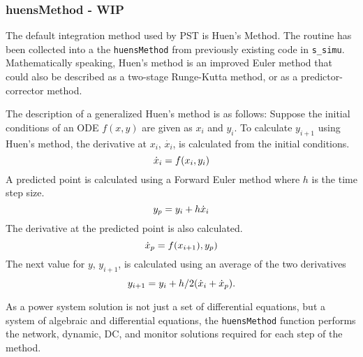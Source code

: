 
\subsubsection{huensMethod - WIP}  
The default integration method used by PST is Huen's Method.
The routine has been collected into a the \verb|huensMethod| from previously existing code in \verb|s_simu|.
Mathematically speaking, Huen's method is an improved Euler method that could also be described as a two-stage Runge-Kutta method, or as a predictor-corrector method.

The description of a generalized Huen's method is as follows:
Suppose the initial conditions of an ODE $f(x,y)$ are given as $x_i$ and $y_i$.
To calculate $y_{i+1}$ using Huen's method, the derivative at $x_i$, $\dot{x_i}$, is calculated from the initial conditions.
\begin{equation}{\label{eq: huens1} }
\dot{x}_i = f(x_i, y_i)
\end{equation} 
\noindent A predicted point is calculated using a Forward Euler method where $h$ is the time step size.
\begin{equation}{\label{eq: huens2} }
y_p = y_i + h \dot{x}_i
\end{equation} 
\noindent The derivative at the predicted point is also calculated.
\begin{equation}{\label{eq: huens3} }
\dot{x}_p = f(x_{i+1}), y_p)
\end{equation} 
\noindent The next value for $y$, $y_{i+1}$, is calculated using an average of the two derivatives
\begin{equation}{\label{eq: huens4} }
y_{i+1} = y_i + h/2( \dot{x}_i + \dot{x}_p ).
\end{equation} 


As a power system solution is not just a set of differential equations, but a system of algebraic and differential equations,
the \verb|huensMethod| function performs the network, dynamic, DC, and monitor solutions required for each step of the method.

